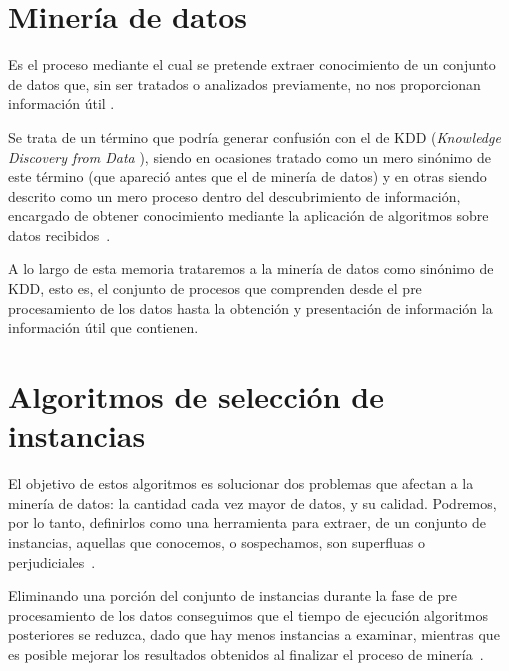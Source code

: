 

\section{Minería de datos}\label{DefMineria}

Es el proceso mediante el cual se pretende extraer conocimiento de un conjunto de datos que, sin ser tratados o analizados previamente, no nos proporcionan información útil \cite{DataMiningConcepts}.

Se trata de un término que podría generar confusión con el de KDD (\textit{Knowledge Discovery from Data} \cite{fayyad1996data}), siendo en ocasiones tratado como un mero sinónimo de este término (que apareció antes que el de minería de datos) y en otras siendo descrito como un mero proceso dentro del descubrimiento de información, encargado de obtener conocimiento mediante la aplicación de algoritmos sobre datos recibidos~\cite{DataMiningConcepts}. 

A lo largo de esta memoria trataremos a la minería de datos como sinónimo de KDD, esto es, el conjunto de procesos que comprenden desde el pre procesamiento de los datos hasta la obtención y presentación de información la información útil que contienen.


\section{Algoritmos de selección de instancias}\label{sec:DefAlgSel}

El objetivo de estos algoritmos es solucionar dos problemas que afectan a la minería de datos: la cantidad cada vez mayor de datos, y su calidad. Podremos, por lo tanto,  definirlos como una herramienta para extraer, de un conjunto de instancias, aquellas que conocemos, o sospechamos, son superfluas o perjudiciales~\cite{IntroInstanceSelect}.

Eliminando una porción del conjunto de instancias durante la fase de pre procesamiento de los datos conseguimos que el tiempo de ejecución algoritmos posteriores se reduzca, dado que hay menos instancias a examinar, mientras que es posible mejorar los resultados obtenidos al finalizar el proceso de minería~\cite{IntroInstanceSelect}.

